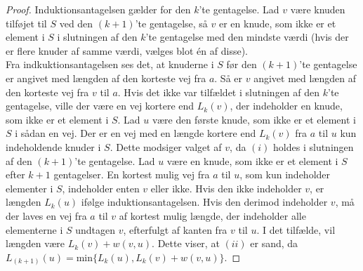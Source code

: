 \begin{proof}
	Induktionsantagelsen gælder for den $k$'te gentagelse. 
	Lad $v$ være knuden tilføjet til $S$ ved den $(k+1)$'te gentagelse, så $v$ er en knude, som ikke er et element i $S$ i slutningen af den $k$'te gentagelse med den mindste værdi (hvis der er flere knuder af samme værdi, vælges blot én af disse). \\
	Fra indkuktionsantagelsen ses det, at knuderne i $S$ før den $(k+1)$'te gentagelse er angivet med længden af den korteste vej fra $a$. 
	Så er $v$ angivet med længden af den korteste vej fra $v$ til $a$. 
	Hvis det ikke var tilfældet i slutningen af den $k$'te gentagelse, ville der være en vej kortere end $L_k(v)$, der indeholder en knude, som ikke er et element i $S$. 
	Lad $u$ være den første knude, som ikke er et element i $S$ i sådan en vej. 
	Der er en vej med en længde kortere end $L_k(v)$ fra $a$ til $u$ kun indeholdende knuder i $S$. 
	Dette modsiger valget af $v$, da $(i)$ holdes i slutningen af den $(k+1)$'te gentagelse.
	Lad $u$ være en knude, som ikke er et element i $S$ efter $k+1$ gentagelser. 
	En kortest mulig vej fra $a$ til $u$, som kun indeholder elementer i $S$, indeholder enten $v$ eller ikke. 
	Hvis den ikke indeholder $v$, er længden $L_k(u)$ ifølge induktionsantagelsen. 
	Hvis den derimod indeholder $v$, må der laves en vej fra $a$ til $v$ af kortest mulig længde, der indeholder alle elementerne i $S$ undtagen $v$, efterfulgt af kanten fra $v$ til $u$. I det tilfælde, vil længden være $L_k(v)+w(v,u)$. Dette viser, at $(ii)$ er sand, da $L_{(k+1)}(u)=\textrm{min} \lbrace L_k(u), L_k(v)+w(v,u) \rbrace$. 
\end{proof}
